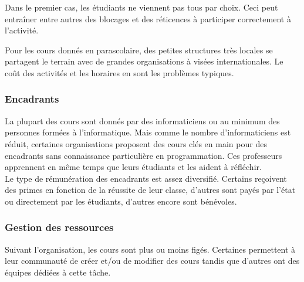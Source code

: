Dans le premier cas, les étudiants ne viennent pas tous par choix. Ceci peut entraîner entre autres des blocages et des réticences à participer correctement à l'activité.

Pour les cours donnés en parascolaire, des petites structures très locales se partagent le terrain avec de grandes organisations à visées internationales. Le coût des activités et les horaires en sont les problèmes typiques.

\subsubsection{Encadrants}
La plupart des cours sont donnés par des informaticiens ou au minimum des personnes formées à l'informatique. Mais comme le nombre d'informaticiens est réduit, certaines organisations proposent des cours clés en main pour des encadrants sans connaissance particulière en programmation. Ces professeurs apprennent en même temps que leurs étudiants et les aident à réfléchir.\\

Le type de rémunération des encadrants est assez diversifié. Certains reçoivent des primes en fonction de la réussite de leur classe, d'autres sont payés par l'état ou directement par les étudiants, d'autres encore sont bénévoles.

\subsubsection{Gestion des ressources}
Suivant l'organisation, les cours sont plus ou moins figés. Certaines permettent à leur communauté de créer et/ou de modifier des cours tandis que d'autres ont des équipes dédiées à cette tâche.
